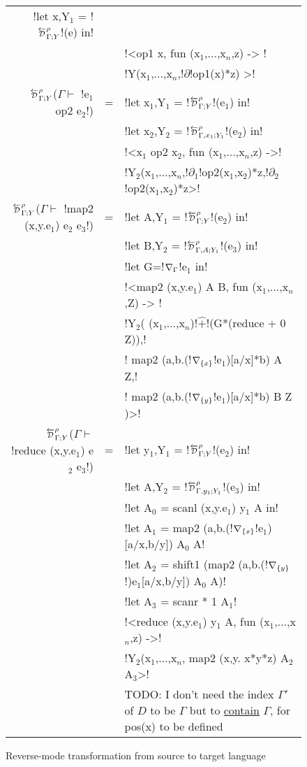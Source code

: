 \begin{figure*}[t]
\begin{tabular}{r c l}
            !let x,Y$_{1}$ = !$\directD{\rho}{\Gamma}{Y}$!(e) in! \\
            && !<op1 x, fun (x$_{1}$,...,x$_n$,z) -> ! \\
            && !Y(x$_{1}$,...,x$_n$,!$\partial$!op1(x)*z) >! \\
        $\directD{\rho}{\Gamma}{Y}$($\Gamma\vdash $ !e$_{1}$ op2 e$_{2}$!) &=& 
            !let x$_{1}$,Y$_{1}$ = !$\directD{\rho}{\Gamma}{Y}$!(e$_{1}$) in! \\
            && !let x$_{2}$,Y$_{2}$ = !$\directD{\rho}{\Gamma,x_1}{Y_1}$!(e$_{2}$) in! \\
            && !<x$_{1}$ op2 x$_{2}$, fun (x$_{1}$,...,x$_n$,z) ->! \\
            && !Y$_{2}$(x$_{1}$,...,x$_n$,!$\partial_1$!op2(x$_{1}$,x$_{2}$)*z,!$\partial_2$!op2(x$_{1}$,x$_{2}$)*z>! \\
        $\directD{\rho}{\Gamma}{Y}$($\Gamma\vdash $ !map2 (x,y.e$_{1}$) e$_{2}$ e$_{3}$!) &=&  
            !let A,Y$_{1}$ = !$\directD{\rho}{\Gamma}{Y}$!(e$_{2}$) in! \\
            && !let B,Y$_{2}$ = !$\directD{\rho}{\Gamma,A}{Y_1}$!(e$_{3}$) in! \\
            && !let G=!$\nabla_{\Gamma}$!e$_{1}$ in!\\
            && !<map2 (x,y.e$_{1}$) A B, fun (x$_{1}$,...,x$_n$,Z) -> !\\
            && !Y$_{2}$( (x$_{1}$,...,x$_n$)!$\widehat{+}$!(G*(reduce + 0 Z)),!\\
            && \quad\quad! map2 (a,b.(!$\nabla_{\{x\}}$!e$_{1}$)[a/x]*b) A Z,!\\
            && \quad\quad! map2 (a,b.(!$\nabla_{\{y\}}$!e$_{1}$)[a/x]*b) B Z )>!\\
        $\directD{\rho}{\Gamma}{Y}$($\Gamma\vdash $ !reduce (x,y.e$_{1}$) e$_{2}$ e$_{3}$!) &=&
            !let y$_{1}$,Y$_{1}$ = !$\directD{\rho}{\Gamma}{Y}$!(e$_{2}$) in! \\
            && !let A,Y$_{2}$ = !$\directD{\rho}{\Gamma,y_1}{Y_1}$!(e$_{3}$) in! \\
            && !let A$_{0}$ = scanl (x,y.e$_{1}$) y$_{1}$ A in! \\
            && !let A$_{1}$ = map2 (a,b.(!$\nabla_{\{x\}}$!e$_{1}$)[a/x,b/y]) A$_{0}$ A! \\
            && !let A$_{2}$ = shift1 (map2 (a,b.(!$\nabla_{\{y\}}$!)e$_{1}$[a/x,b/y]) A$_{0}$ A)! \\
            && !let A$_{3}$ = scanr * 1 A$_{1}$! \\
            && !<reduce (x,y.e$_{1}$) y$_{1}$ A, fun (x$_{1}$,...,x$_n$,z) ->! \\
            && !Y$_{2}$(x$_{1}$,...,x$_n$, map2 (x,y. x*y*z) A$_{2}$ A$_{3}$>! \\
            && TODO: I don't need the index $\Gamma'$ of $D$ to be $\Gamma$ but to \underline{contain} $\Gamma$, for pos(x) to be defined
        \end{tabular}
    \caption{Reverse-mode transformation from source to target language}
    \label{fig:direct_diff_macro}    
\end{figure*}